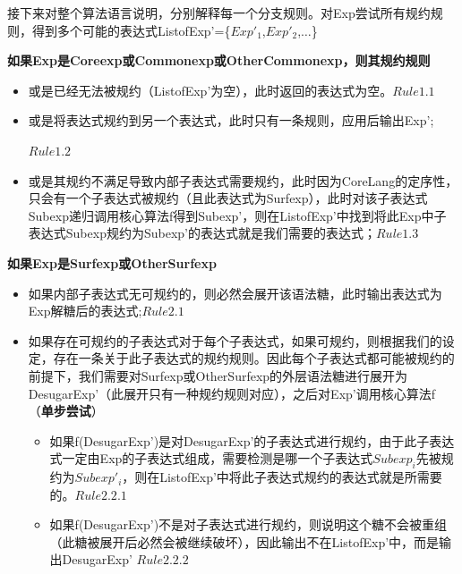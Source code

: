 接下来对整个算法语言说明，分别解释每一个分支规则。对Exp尝试所有规约规则，得到多个可能的表达式ListofExp'=\{$Exp'_{1}$,$Exp'_{2}$,$\ldots$\}

\begin{flushleft}
	\large{\bfseries{
			如果Exp是Coreexp或Commonexp或OtherCommonexp，则其规约规则	
		}	
	}	
\end{flushleft}
\begin{itemize}
	\item 或是已经无法被规约（ListofExp'为空），此时返回的表达式为空。\hfill $Rule1.1$
	\item 或是将表达式规约到另一个表达式，此时只有一条规则，应用后输出Exp';
	
	\hfill $Rule1.2$
	\item 或是其规约不满足导致内部子表达式需要规约，此时因为CoreLang的定序性，只会有一个子表达式被规约（且此表达式为Surfexp），此时对该子表达式Subexp递归调用核心算法f得到Subexp’，则在ListofExp'中找到将此Exp中子表达式Subexp规约为Subexp’的表达式就是我们需要的表达式；\hfill $Rule1.3$
	
\end{itemize}

\begin{flushleft}
	\large{\bfseries{
			如果Exp是Surfexp或OtherSurfexp	
		}
	}
\end{flushleft}
\begin{itemize}
	\item 如果内部子表达式无可规约的，则必然会展开该语法糖，此时输出表达式为Exp解糖后的表达式;\hfill $Rule2.1$
	\item 如果存在可规约的子表达式对于每个子表达式，如果可规约，则根据我们的设定，存在一条关于此子表达式的规约规则。因此每个子表达式都可能被规约的前提下，我们需要对Surfexp或OtherSurfexp的外层语法糖进行展开为DesugarExp’（此展开只有一种规约规则对应），之后对Exp’调用核心算法f（{\bfseries 单步尝试}）
	\begin{itemize}
		\item 如果f(DesugarExp')是对DesugarExp'的子表达式进行规约，由于此子表达式一定由Exp的子表达式组成，需要检测是哪一个子表达式$Subexp_{i}$先被规约为$Subexp'_{i}$，则在ListofExp'中将此子表达式规约的表达式就是所需要的。\hfill $Rule2.2.1$
		\item 如果f(DesugarExp')不是对子表达式进行规约，则说明这个糖不会被重组（此糖被展开后必然会被继续破坏），因此输出不在ListofExp'中，而是输出DesugarExp' \hfill $Rule2.2.2$ 
	\end{itemize}
\end{itemize}

